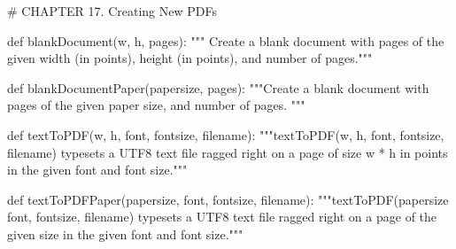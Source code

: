 # CHAPTER 17. Creating New PDFs

def blankDocument(w, h, pages):
    """ Create a blank document
    with pages of the given width (in points), height (in points), and number
    of pages."""

def blankDocumentPaper(papersize, pages):
    """Create a blank document with pages of the given paper size, and number
    of pages. """

def textToPDF(w, h, font, fontsize, filename):
    """textToPDF(w, h, font, fontsize, filename) typesets a UTF8 text file
    ragged right on a page of size w * h in points in the given font and font
    size."""

def textToPDFPaper(papersize, font, fontsize, filename):
    """textToPDF(papersize font, fontsize, filename) typesets a UTF8 text file
    ragged right on a page of the given size in the given font and font
    size."""
